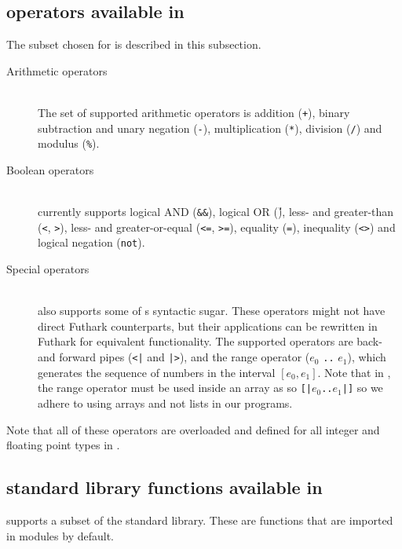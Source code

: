 \subsection{\fsharp{} operators available in \fshark{}}
The \fsharp{} subset chosen for \fshark{} is described in this subsection.
\begin{description}
\item[Arithmetic operators]\hfill\\
  The set of supported arithmetic operators is addition (\texttt{+}),
  binary subtraction and unary negation (\texttt{-}), multiplication
  (\texttt{*}), division (\texttt{/}) and modulus (\texttt{\%}).
  
\item[Boolean operators]\hfill\\
  \fshark{} currently supports logical AND (\texttt{\&\&}), logical OR
  (\texttt{\|\|}), less- and greater-than (\texttt{<}, \texttt{>}), less- and
  greater-or-equal (\texttt{<=}, \texttt{>=}), equality (\texttt{=}),
  inequality (\texttt{<>}) and logical negation (\texttt{not}).

\item[Special operators]\hfill\\
  \fshark{} also supports some of \fsharp{}s syntactic sugar. These operators
  might not have direct Futhark counterparts, but their applications can be
  rewritten in Futhark for equivalent functionality.
  The supported operators are back- and forward pipes (\texttt{<|} and
  \texttt{|>}), and the range operator ($e_0$ \texttt{..} $e_1$), which
  generates the sequence of numbers in the interval $[e_0,e_1]$. Note that in
  \fshark{}, the range operator must be used inside an array as so
  \texttt{[|$e_0$..$e_1$|]} so we adhere to using arrays and not lists in our
  \fshark{} programs.
\end{description}
Note that all of these operators are overloaded and defined for all integer
and floating point types in \fsharp{}.



\subsection{\fsharp{} standard library functions available in \fshark{}}
\fshark{} supports a subset of the \fsharp{} standard library. These are
functions that are imported in \fsharp{} modules by default.

